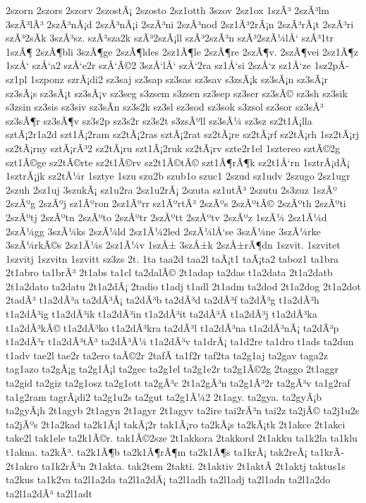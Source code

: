 {2szorn
2szors
2szorv
2szostÃ¡
2szosto
2sz1otth
3szov
2sz1ox
1szÃ³
2szÃ³lm
3szÃ³lÃ³
2szÃ³nÃ¡d
2szÃ³nÃ¡i
2szÃ³ni
2szÃ³nod
2sz1Ã³2rÃ¡n
2szÃ³rÃ¡t
2szÃ³ri
szÃ³2sÃ­k
3szÃ³sz.
szÃ³sza2k
szÃ³2szÃ¡ll
szÃ³2szÃ³n
szÃ³2szÃ¼lÅ‘
szÃ³1tr
1szÃ¶
2szÃ¶bli
3szÃ¶ge
2szÃ¶ldes
2sz1Ã¶le
2szÃ¶re
2szÃ¶v.
2szÃ¶vei
2sz1Ã¶z
1szÅ‘
szÅ‘a2
szÅ‘e2r
szÅ‘Ã©2
3szÅ‘lÅ‘
szÅ‘2ra
sz1Å‘si
2szÅ‘z
sz1Å‘ze
1sz2pÃ­
sz1pl
1szponz
szrÃ¡di2
sz3saj
sz3sap
sz3sas
sz3sav
s3zsÃ¡k
sz3sÃ¡n
sz3sÃ¡r
sz3sÃ¡s
sz3sÃ¡t
sz3sÃ¡v
sz3seg
s3zsem
s3zsen
sz3sep
sz3ser
sz3sÃ©
sz3sh
sz3sik
s3zsin
sz3sis
sz3siv
sz3sÃ­n
sz3s2k
sz3sl
sz3sod
sz3sok
s3zsol
sz3sor
sz3sÃ³
sz3sÃ¶r
sz3sÃ¶v
sz3s2p
sz3s2r
sz3s2t
s3zsÃºll
sz3sÃ¼
sz3sz
sz2t1Ã¡lla
sztÃ¡2r1a2d
szt1Ã¡2ram
sz2tÃ¡2ras
sztÃ¡2rat
sz2tÃ¡re
sz2tÃ¡rf
sz2tÃ¡rh
1sz2tÃ¡rj
sz2tÃ¡rny
sztÃ¡rÃ³2
sz2tÃ¡ru
szt1Ã¡2ruk
sz2tÃ¡rv
szte2r1el
1sztereo
sztÃ©2g
szt1Ã©ge
sz2tÃ©rte
sz2t1Ã©rv
sz2t1Ã©tÃ©
szt1Ã¶rÃ¶k
sz2t1Å‘rn
1sztrÃ¡dÃ¡
1sztrÃ¡jk
sz2tÃ¼r
1sztye
1szu
szu2b
szub1o
szuc1
2szud
sz1udv
2szugo
2sz1ugr
2szuh
2sz1uj
3szukÃ¡
sz1u2ra
2sz1u2rÃ¡
2szuta
sz1utÃ³
2szutu
2s3zuz
1szÃº
2szÃºg
2szÃºj
sz1Ãºron
2sz1Ãºrr
sz1ÃºrtÃ³
2szÃºs
2szÃºtÃ©
2szÃºth
2szÃºti
2szÃºtj
2szÃºtn
2szÃºto
2szÃºtr
2szÃºtt
2szÃºtv
2szÃºz
1szÃ¼
2sz1Ã¼d
2szÃ¼gg
3szÃ¼ks
2szÃ¼ld
2sz1Ã¼2led
2szÃ¼lÅ‘se
3szÃ¼ne
3szÃ¼rke
3szÃ¼rkÃ©s
2sz1Ã¼s
2sz1Ã¼v
1szÅ±
3szÅ±k
2szÅ±rÃ¶dn
1szvit.
1szvitet
1szvitj
1szvitn
1szvitt
sz3zs
2t.
1ta
taa2d
taa2l
taÃ¡t1
taÃ¡ta2
taboz1
ta1bra
2t1abro
ta1brÃ³
2t1abs
ta1cl
ta2dalÃ©
2t1adap
ta2das
t1a2data
2t1a2datb
2t1a2dato
ta2datu
2t1a2dÃ¡
2tadio
t1adj
t1adl
2t1adm
ta2dod
2t1a2dog
2t1a2dot
2tadÃ³
t1a2dÃ³a
ta2dÃ³Ã¡
ta2dÃ³b
ta2dÃ³d
ta2dÃ³f
ta2dÃ³g
t1a2dÃ³h
t1a2dÃ³ig
t1a2dÃ³ik
t1a2dÃ³in
t1a2dÃ³it
ta2dÃ³Ã­
t1a2dÃ³j
t1a2dÃ³ka
t1a2dÃ³kÃ©
t1a2dÃ³ko
t1a2dÃ³kra
ta2dÃ³l
t1a2dÃ³na
t1a2dÃ³nÃ¡
ta2dÃ³p
t1a2dÃ³r
t1a2dÃ³tÃ³
ta2dÃ³Ã¼
t1a2dÃ³v
ta1drÃ¡
ta1d2re
ta1dro
t1ads
ta2dun
t1adv
tae2l
tae2r
ta2ero
taÃ©2r
2tafÃ­
ta1f2r
taf2ta
ta2g1aj
ta2gav
taga2z
tag1azo
ta2gÃ¡g
ta2g1Ã¡l
ta2gec
ta2g1el
ta2g1e2r
ta2g1Ã©2g
2taggo
2t1aggr
ta2gid
ta2giz
ta2g1osz
ta2g1ott
ta2gÃ³c
2t1a2gÃ³n
ta2g1Ã³2r
ta2gÃ³v
ta1g2raf
ta1g2ram
tagrÃ¡di2
ta2g1u2s
ta2gut
ta2g1Ã¼2
2t1agy.
ta2gya.
ta2gyÃ¡b
ta2gyÃ¡h
2t1agyb
2t1agyn
2t1agyr
2t1agyv
ta2ire
tai2rÃ³n
tai2z
ta2jÃ©
ta2j1u2s
ta2jÃºs
2t1a2kad
ta2k1Ã¡l
takÃ¡2r
tak1Ã¡ro
ta2kÃ¡s
ta2kÃ¡tk
2t1akce
2t1akci
take2l
tak1ele
ta2k1Ã©r.
tak1Ã©2sze
2t1akkora
2takkord
2t1akku
ta1k2la
ta1klu
t1akna.
ta2kÃ³.
ta2k1Ã¶b
ta2k1Ã¶rÃ¶m
ta2k1Ã¶s
ta1krÃ¡
tak2reÃ¡
ta1krÃ­
2t1akro
ta1k2rÃ³n
2t1akta.
tak2tem
2takti.
2t1aktiv
2t1aktÃ­
2t1aktj
taktus1s
ta2kus
ta1k2va
ta2l1a2da
ta2l1a2dÃ¡
ta2l1adh
ta2l1adj
ta2l1adn
ta2l1a2do
ta2l1a2dÃ³
ta2l1adt
}
